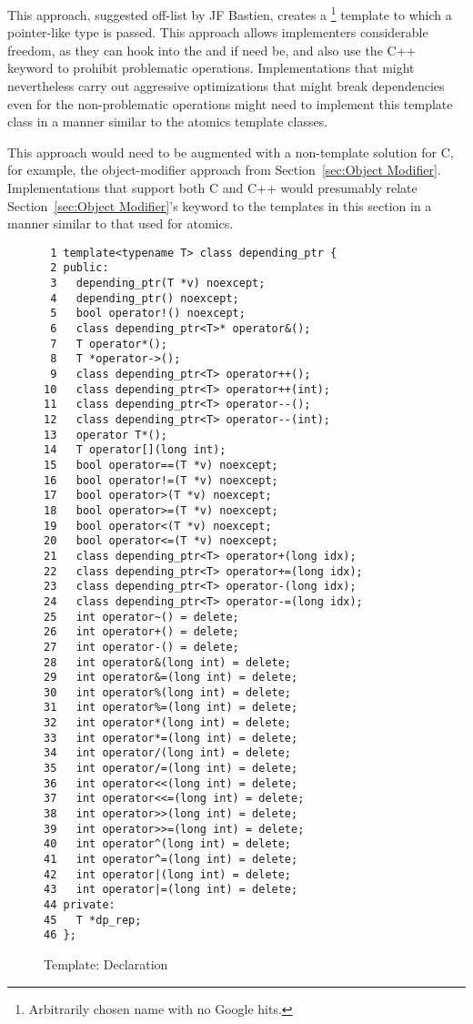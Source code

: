 This approach, suggested off-list by JF Bastien, creates a
\footnote{
	Arbitrarily chosen name with no Google hits.}
template to which a pointer-like type is passed.
This approach allows implementers considerable freedom, as they can
hook into the \co{->} and \co{*} if need be, and also use the C++
 keyword to prohibit problematic operations.
Implementations that might nevertheless carry out aggressive
optimizations that might break dependencies even for the non-problematic
operations might need to implement this template class in a manner
similar to the atomics template classes.

This approach would need to be augmented with a non-template solution
for C, for example, the object-modifier approach from
Section~\ref{sec:Object Modifier}.
Implementations that support both C and C++ would presumably relate
Section~\ref{sec:Object Modifier}'s
keyword to the templates in this section in a manner similar to
that used for atomics.

\begin{figure}[tbp]
{ \scriptsize
\begin{verbatim}
 1 template<typename T> class depending_ptr {
 2 public:
 3   depending_ptr(T *v) noexcept;
 4   depending_ptr() noexcept;
 5   bool operator!() noexcept;
 6   class depending_ptr<T>* operator&();
 7   T operator*();
 8   T *operator->();
 9   class depending_ptr<T> operator++();
10   class depending_ptr<T> operator++(int);
11   class depending_ptr<T> operator--();
12   class depending_ptr<T> operator--(int);
13   operator T*();
14   T operator[](long int);
15   bool operator==(T *v) noexcept;
16   bool operator!=(T *v) noexcept;
17   bool operator>(T *v) noexcept;
18   bool operator>=(T *v) noexcept;
19   bool operator<(T *v) noexcept;
20   bool operator<=(T *v) noexcept;
21   class depending_ptr<T> operator+(long idx);
22   class depending_ptr<T> operator+=(long idx);
23   class depending_ptr<T> operator-(long idx);
24   class depending_ptr<T> operator-=(long idx);
25   int operator~() = delete;
26   int operator+() = delete;
27   int operator-() = delete;
28   int operator&(long int) = delete;
29   int operator&=(long int) = delete;
30   int operator%(long int) = delete;
31   int operator%=(long int) = delete;
32   int operator*(long int) = delete;
33   int operator*=(long int) = delete;
34   int operator/(long int) = delete;
35   int operator/=(long int) = delete;
36   int operator<<(long int) = delete;
37   int operator<<=(long int) = delete;
38   int operator>>(long int) = delete;
39   int operator>>=(long int) = delete;
40   int operator^(long int) = delete;
41   int operator^=(long int) = delete;
42   int operator|(long int) = delete;
43   int operator|=(long int) = delete;
44 private:
45   T *dp_rep;
46 };
\end{verbatim}
}
\caption{Template: Declaration}
\label{fig:Template: Declaration}
\end{figure}

